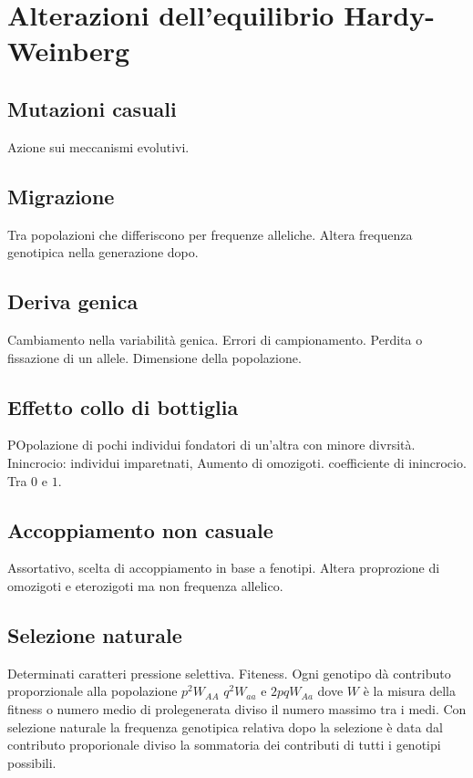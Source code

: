 \section{Alterazioni dell'equilibrio Hardy-Weinberg}

	\subsection{Mutazioni casuali}
	Azione sui meccanismi evolutivi.

	\subsection{Migrazione}
	Tra popolazioni che differiscono per frequenze alleliche.
	Altera frequenza genotipica nella generazione dopo.

	\subsection{Deriva genica}
	Cambiamento nella variabilit\`a genica.
	Errori di campionamento.
	Perdita o fissazione di un allele.
	Dimensione della popolazione.

	\subsection{Effetto collo di bottiglia}
	POpolazione di pochi individui fondatori di un'altra con minore divrsit\`a.
	Inincrocio: individui imparetnati,
	Aumento di omozigoti. coefficiente di inincrocio. Tra $0$ e $1$.

	\subsection{Accoppiamento non casuale}
	Assortativo, scelta di accoppiamento in base a fenotipi.
	Altera proprozione di omozigoti e eterozigoti ma non frequenza allelico.

	\subsection{Selezione naturale}
	Determinati caratteri pressione selettiva. Fiteness.
	Ogni genotipo d\`a contributo proporzionale alla popolazione $p^2W_{AA}$ $q^2W_{aa}$ e $2pqW_{Aa}$ dove $W$ \`e la misura della fitness o numero medio di prolegenerata diviso il numero massimo tra i medi.
	Con selezione naturale la frequenza genotipica relativa dopo la selezione \`e data dal contributo proporionale diviso la sommatoria dei contributi di tutti i genotipi possibili.

